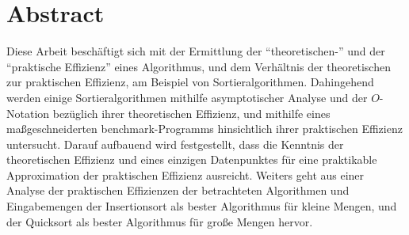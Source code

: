 \chapter*{Abstract}
\label{cha:abstract}

Diese Arbeit beschäftigt sich mit der Ermittlung der \enquote{theoretischen-} und der \enquote{praktische Effizienz} eines Algorithmus, und dem Verhältnis der theoretischen zur praktischen Effizienz, am Beispiel von Sortieralgorithmen. Dahingehend werden einige Sortieralgorithmen mithilfe asymptotischer Analyse und der $O$-Notation bezüglich ihrer theoretischen Effizienz, und mithilfe eines maßgeschneiderten benchmark-Programms hinsichtlich ihrer praktischen Effizienz untersucht. Darauf aufbauend wird festgestellt, dass die Kenntnis der theoretischen Effizienz und eines einzigen Datenpunktes für eine praktikable Approximation der praktischen Effizienz ausreicht. Weiters geht aus einer Analyse der praktischen Effizienzen der betrachteten Algorithmen und Eingabemengen der Insertionsort als bester Algorithmus für kleine Mengen, und der Quicksort als bester Algorithmus für große Mengen hervor.
